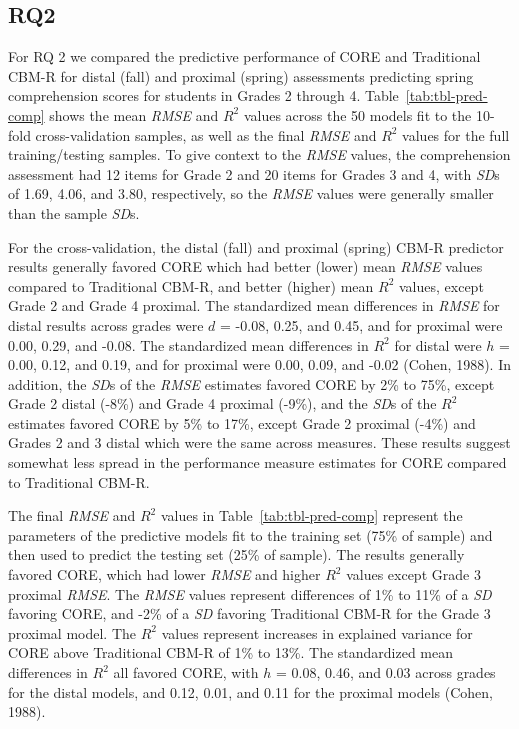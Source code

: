 \documentclass[
  english,
  man, fleqn, noextraspace]{apa6}
\begin{document}
\hypertarget{rq2}{%
\subsection{RQ2}\label{rq2}}

For RQ 2 we compared the predictive performance of CORE and Traditional CBM-R for distal (fall) and proximal (spring) assessments predicting spring comprehension scores for students in Grades 2 through 4. Table~\ref{tab:tbl-pred-comp} shows the mean \emph{RMSE} and \(R^2\) values across the 50 models fit to the 10-fold cross-validation samples, as well as the final \emph{RMSE} and \(R^2\) values for the full training/testing samples. To give context to the \emph{RMSE} values, the comprehension assessment had 12 items for Grade 2 and 20 items for Grades 3 and 4, with \emph{SD}s of 1.69, 4.06, and 3.80, respectively, so the \emph{RMSE} values were generally smaller than the sample \emph{SD}s.

For the cross-validation, the distal (fall) and proximal (spring) CBM-R predictor results generally favored CORE which had better (lower) mean \emph{RMSE} values compared to Traditional CBM-R, and better (higher) mean \(R^2\) values, except Grade 2 and Grade 4 proximal. The standardized mean differences in \emph{RMSE} for distal results across grades were \(d\) = -0.08, 0.25, and 0.45, and for proximal were 0.00, 0.29, and -0.08. The standardized mean differences in \(R^2\) for distal were \(h\) = 0.00, 0.12, and 0.19, and for proximal were 0.00, 0.09, and -0.02 (Cohen, 1988). In addition, the \emph{SD}s of the \emph{RMSE} estimates favored CORE by 2\% to 75\%, except Grade 2 distal (-8\%) and Grade 4 proximal (-9\%), and the \emph{SD}s of the \(R^2\) estimates favored CORE by 5\% to 17\%, except Grade 2 proximal (-4\%) and Grades 2 and 3 distal which were the same across measures. These results suggest somewhat less spread in the performance measure estimates for CORE compared to Traditional CBM-R.

The final \emph{RMSE} and \(R^2\) values in Table~\ref{tab:tbl-pred-comp} represent the parameters of the predictive models fit to the training set (75\% of sample) and then used to predict the testing set (25\% of sample). The results generally favored CORE, which had lower \emph{RMSE} and higher \(R^2\) values except Grade 3 proximal \emph{RMSE}. The \emph{RMSE} values represent differences of 1\% to 11\% of a \emph{SD} favoring CORE, and -2\% of a \emph{SD} favoring Traditional CBM-R for the Grade 3 proximal model. The \(R^2\) values represent increases in explained variance for CORE above Traditional CBM-R of 1\% to 13\%. The standardized mean differences in \(R^2\) all favored CORE, with \(h\) = 0.08, 0.46, and 0.03 across grades for the distal models, and 0.12, 0.01, and 0.11 for the proximal models (Cohen, 1988).
\end{document}
